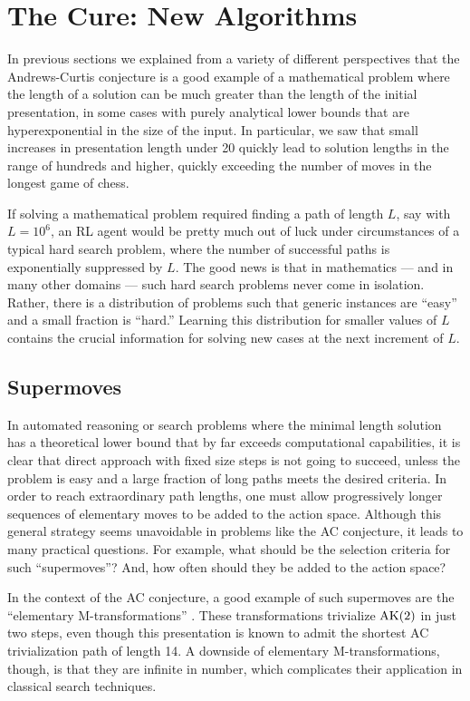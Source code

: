 \section{The Cure: New Algorithms}\label{sec:algo}

In previous sections we explained from a variety of different perspectives that the Andrews-Curtis conjecture is a good example of a mathematical problem where the length of a solution can be much greater than the length of the initial presentation, in some cases with purely analytical lower bounds that are hyperexponential in the size of the input. In particular, we saw that small increases in presentation length under 20 quickly lead to solution lengths in the range of hundreds and higher, quickly exceeding the number of moves in the longest game of chess.

If solving a mathematical problem required finding a path of length $L$, say with $L=10^6$, an RL agent would be pretty much out of luck under circumstances of a typical hard search problem, where the number of successful paths is exponentially suppressed by $L$. The good news is that in mathematics --- and in many other domains --- such hard search problems never come in isolation. Rather, there is a distribution of problems such that generic instances are ``easy'' and a small fraction is ``hard.'' Learning this distribution for smaller values of $L$ contains the crucial information for solving new cases at the next increment of $L$.

\subsection{Supermoves}

In automated reasoning or search problems where the minimal length solution has a theoretical lower bound that by far exceeds computational capabilities, it is clear that direct approach with fixed size steps is not going to succeed, unless the problem is easy and a large fraction of long paths meets the desired criteria. In order to reach extraordinary path lengths, one must allow progressively longer sequences of elementary moves to be added to the action space. Although this general strategy seems unavoidable in problems like the AC conjecture, it leads to many practical questions. For example, what should be the selection criteria for such ``supermoves''? And, how often should they be added to the action space?

In the context of the AC conjecture, a good example of such supermoves are the ``elementary M-transformations'' \cite{BurnsI, BurnsII}. These transformations trivialize $\text{AK}(2)$ in just two steps, even though this presentation is known to admit the shortest AC trivialization path of length 14. A downside of elementary M-transformations, though, is that they are infinite in number, which complicates their application in classical search techniques.

